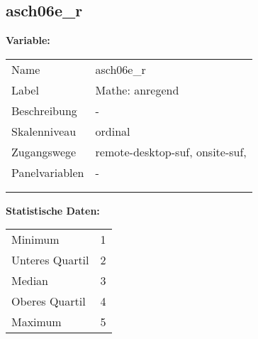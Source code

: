 	
	
	\subsection{asch06e\_r}
	\label{subSection:asch06e_r}

	\noindent\textbf{Variable:}\\
		\begin{tabular}{lL{11.3cm}}
			\label{tableVariable:asch06e_r}
			Name & asch06e\_r \\
			Label & Mathe: anregend \\
			Beschreibung & - \\
			Skalenniveau & ordinal \\
			Zugangswege &
				remote-desktop-suf,
				onsite-suf,
 \\
			Panelvariablen & -
			 \\
			 \\
 \\
		\end{tabular}



		\vspace*{1 cm}
		\noindent\textbf{Statistische Daten:}\\
			\begin{tabular}{ll}
				\label{tableStatistics:asch06e_r}
					Minimum & 1 \\
					Unteres Quartil & 2 \\
					Median & 3 \\
					Oberes Quartil & 4 \\
					Maximum & 5 \\
			\end{tabular}



